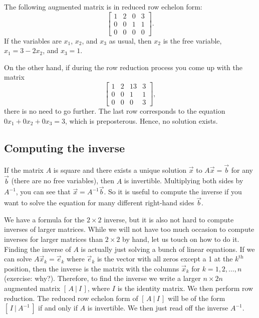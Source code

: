 \begin{example}
The following augmented matrix is in reduced row echelon form:
\begin{equation*}
\left[
\begin{array}{ccc|c}
1 & 2 & 0 & 3 \\
0 & 0 & 1 & 1 \\
0 & 0 & 0 & 0
\end{array}
\right]
.
\end{equation*}
If the variables are $x_1$, $x_2$, and $x_3$ as usual,
then $x_2$ is the
free variable, $x_1 = 3 - 2x_2$, and $x_3 = 1$.

\medskip

On the other hand, if during the row reduction process you come up with the
matrix
\begin{equation*}
\left[
\begin{array}{ccc|c}
1 & 2 & 13 & 3 \\
0 & 0 & 1 & 1 \\
0 & 0 & 0 & 3
\end{array}
\right]
,
\end{equation*}
there is no need to go further.  The last row corresponds to
the equation $0 x_1 + 0 x_2 + 0 x_3 = 3$, which is preposterous.  Hence, no
solution exists.
\end{example}

\subsection{Computing the inverse}

If the matrix $A$ is square and there exists a unique solution
$\vec{x}$ to $A \vec{x} = \vec{b}$ for any $\vec{b}$ (there are no free
variables), then $A$ is invertible.
Multiplying both sides by $A^{-1}$, you can see that $\vec{x} =
A^{-1} \vec{b}$.  So it is useful to compute the inverse if you want to
solve the equation for many different right-hand sides $\vec{b}$.

We have a formula for
the $2 \times 2$ inverse, but it is also not hard
to compute inverses of larger matrices.
While we will not have too much occasion to compute inverses for larger
matrices than $2 \times 2$ by hand, let us touch on how to do it.
Finding the inverse of $A$ is actually just solving a bunch of linear
equations.  If we can solve $A \vec{x}_k = \vec{e}_k$ where $\vec{e}_k$ is
the vector with all zeros except a 1 at the $k^{\text{th}}$ position, then
the inverse is the matrix with the columns $\vec{x}_k$ for $k=1,2,\ldots,n$
(exercise: why?).  Therefore, to find the inverse we write a larger $n
\times 2n$ augmented matrix $[ \,A ~|~ I\, ]$, where $I$ is the identity
matrix.
We then perform row reduction.
The reduced row echelon form of $[ \,A ~|~ I\, ]$ 
will be of the form $[ \,I ~|~ A^{-1}\, ]$ if and only if
$A$ is invertible.  We then just read off the inverse $A^{-1}$.

